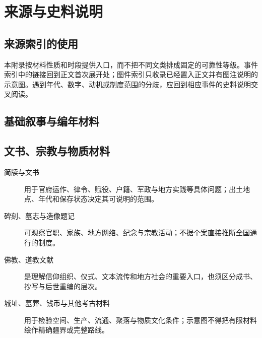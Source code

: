 \chapter{来源与史料说明}
\label{app:sources}

\section{来源索引的使用}
\label{app:sources:guide}

本附录按材料性质和时段提供入口，而不把不同文类排成固定的可靠性等级。事件索引中的链接回到正文首次展开处；图件索引只收录已经置入正文并有图注说明的示意图。遇到年代、数字、动机或制度范围的分歧，应回到相应事件的史料说明交叉阅读。

\section{基础叙事与编年材料}
\label{app:sources:narrative}

\begin{description}
\end{description}

\section{文书、宗教与物质材料}
\label{app:sources:documents}

\begin{description}
  \item[简牍与文书] 用于官府运作、律令、赋役、户籍、军政与地方实践等具体问题；出土地点、年代和保存状态决定其可说明的范围。
  \item[碑刻、墓志与造像题记] 可观察官职、家族、地方网络、纪念与宗教活动；不据个案直接推断全国通行的制度。
  \item[佛教、道教文献] 是理解信仰组织、仪式、文本流传和地方社会的重要入口，也须区分成书、抄写与后世重编的层次。
  \item[城址、墓葬、钱币与其他考古材料] 用于检验空间、生产、流通、聚落与物质文化条件；示意图不得把有限材料绘作精确疆界或完整路线。
\end{description}

